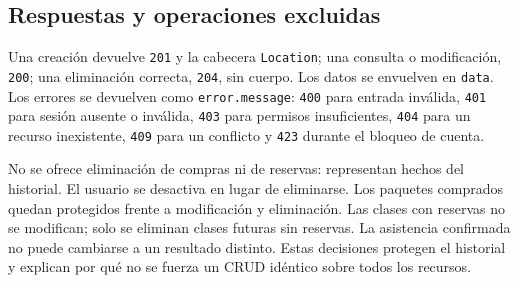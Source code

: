 \subsection{Respuestas y operaciones excluidas}
Una creación devuelve \texttt{201} y la cabecera \texttt{Location}; una consulta o modificación, \texttt{200}; una eliminación correcta, \texttt{204}, sin cuerpo. Los datos se envuelven en \texttt{data}. Los errores se devuelven como \texttt{error.message}: \texttt{400} para entrada inválida, \texttt{401} para sesión ausente o inválida, \texttt{403} para permisos insuficientes, \texttt{404} para un recurso inexistente, \texttt{409} para un conflicto y \texttt{423} durante el bloqueo de cuenta.

No se ofrece eliminación de compras ni de reservas: representan hechos del historial. El usuario se desactiva en lugar de eliminarse. Los paquetes comprados quedan protegidos frente a modificación y eliminación. Las clases con reservas no se modifican; solo se eliminan clases futuras sin reservas. La asistencia confirmada no puede cambiarse a un resultado distinto. Estas decisiones protegen el historial y explican por qué no se fuerza un CRUD idéntico sobre todos los recursos.


